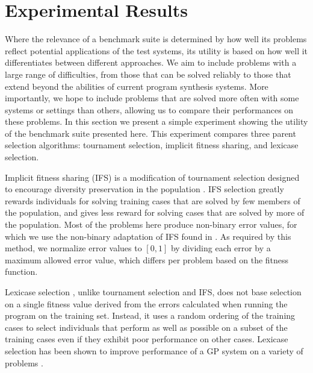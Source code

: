 \documentclass{sig-alternate}
\begin{document}
\section{Experimental Results}

Where the relevance of a benchmark suite is determined by how well its problems reflect potential applications of the test systems, its utility is based on how well it differentiates between different approaches. We aim to include problems with a large range of difficulties, from those that can be solved reliably to those that extend beyond the abilities of current program synthesis systems. More importantly, we hope to include problems that are solved more often with some systems or settings than others, allowing us to compare their performances on these problems.
In this section we present a simple experiment showing the utility of the benchmark suite presented here. This experiment compares three parent selection algorithms: tournament selection, implicit fitness sharing, and lexicase selection.

Implicit fitness sharing (IFS) is a modification of tournament selection designed to encourage diversity preservation in the population \cite{McKay:2000:GECCO}. IFS selection greatly rewards individuals for solving training cases that are solved by few members of the population, and gives less reward for solving cases that are solved by more of the population. Most of the problems here produce non-binary error values, for which we use the non-binary adaptation of IFS found in \cite{Krawiec:2013:EvoIASP}. As required by this method, we normalize error values to $[0, 1]$ by dividing each error by a maximum allowed error value, which differs per problem based on the fitness function.

Lexicase selection \cite{Helmuth:2014:ieeeTEC}, %
 unlike tournament selection and IFS, does not base selection on a single fitness value derived from the errors calculated when running the program on the training set. Instead, it uses a random ordering of the training cases to select individuals that perform as well as possible on a subset of the training cases even if they exhibit poor performance on other cases. Lexicase selection has been shown to improve performance of a GP system on a variety of problems \cite{Helmuth:2014:ieeeTEC, Helmuth:2014:GECCO}. %
\end{document}
